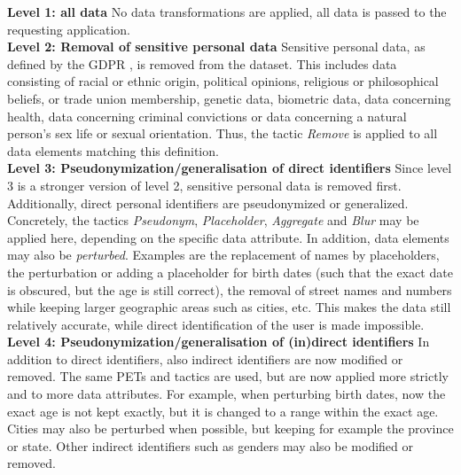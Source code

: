 \noindent \textbf{Level 1: all data} No data transformations are applied, all data is passed to the requesting application.\\

\noindent \textbf{Level 2: Removal of sensitive personal data} Sensitive personal data, as defined by the GDPR \citep{gdpr}, is removed from the dataset. This includes data consisting of racial or ethnic origin, political opinions, religious or philosophical beliefs, or trade union membership, genetic data, biometric data, data concerning health, data concerning criminal convictions or data concerning a natural person's sex life or sexual orientation. Thus, the tactic \textit{Remove} is applied to all data elements matching this definition.\\

\noindent \textbf{Level 3: Pseudonymization/generalisation of direct identifiers} Since level 3 is a stronger version of level 2, sensitive personal data is removed first. Additionally, direct personal identifiers are pseudonymized or generalized. Concretely, the tactics \textit{Pseudonym}, \textit{Placeholder}, \textit{Aggregate} and \textit{Blur} may be applied here, depending on the specific data attribute. In addition, data elements may also be \textit{perturbed}. Examples are the replacement of names by placeholders, the perturbation or adding a placeholder for birth dates (such that the exact date is obscured, but the age is still correct), the removal of street names and numbers while keeping larger geographic areas such as cities, etc. This makes the data still relatively accurate, while direct identification of the user is made impossible.\\

\noindent \textbf{Level 4: Pseudonymization/generalisation of (in)direct identifiers} In addition to direct identifiers, also indirect identifiers are now modified or removed. The same \gls{PETs} and tactics are used, but are now applied more strictly and to more data attributes. For example, when perturbing birth dates, now the exact age is not kept exactly, but it is changed to a range within the exact age. Cities may also be perturbed when possible, but keeping for example the province or state. Other indirect identifiers such as genders may also be modified or removed.

